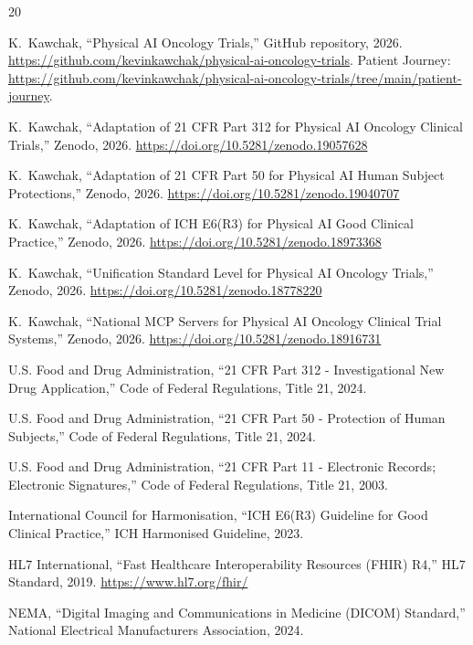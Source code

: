 \begin{thebibliography}{20}

K.~Kawchak, ``Physical AI Oncology Trials,'' GitHub repository, 2026.
\url{https://github.com/kevinkawchak/physical-ai-oncology-trials}. Patient Journey: \url{https://github.com/kevinkawchak/physical-ai-oncology-trials/tree/main/patient-journey}.

K.~Kawchak, ``Adaptation of 21 CFR Part 312 for Physical AI Oncology Clinical Trials,'' Zenodo, 2026.
\url{https://doi.org/10.5281/zenodo.19057628}

K.~Kawchak, ``Adaptation of 21 CFR Part 50 for Physical AI Human Subject Protections,'' Zenodo, 2026.
\url{https://doi.org/10.5281/zenodo.19040707}

K.~Kawchak, ``Adaptation of ICH E6(R3) for Physical AI Good Clinical Practice,'' Zenodo, 2026.
\url{https://doi.org/10.5281/zenodo.18973368}

K.~Kawchak, ``Unification Standard Level for Physical AI Oncology Trials,'' Zenodo, 2026.
\url{https://doi.org/10.5281/zenodo.18778220}

K.~Kawchak, ``National MCP Servers for Physical AI Oncology Clinical Trial Systems,'' Zenodo, 2026.
\url{https://doi.org/10.5281/zenodo.18916731}

U.S. Food and Drug Administration, ``21 CFR Part 312 - Investigational New Drug Application,'' Code of Federal Regulations, Title 21, 2024.

U.S. Food and Drug Administration, ``21 CFR Part 50 - Protection of Human Subjects,'' Code of Federal Regulations, Title 21, 2024.

U.S. Food and Drug Administration, ``21 CFR Part 11 - Electronic Records; Electronic Signatures,'' Code of Federal Regulations, Title 21, 2003.

International Council for Harmonisation, ``ICH E6(R3) Guideline for Good Clinical Practice,'' ICH Harmonised Guideline, 2023.

HL7 International, ``Fast Healthcare Interoperability Resources (FHIR) R4,'' HL7 Standard, 2019.
\url{https://www.hl7.org/fhir/}

NEMA, ``Digital Imaging and Communications in Medicine (DICOM) Standard,'' National Electrical Manufacturers Association, 2024.


\end{thebibliography}
